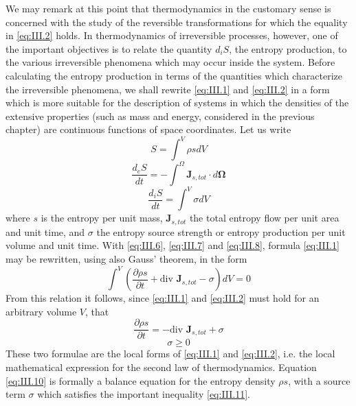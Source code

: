 We may remark at this point that thermodynamics in the customary
sense is concerned with the study of the reversible transformations for
which the equality in \eqref{eq:III.2} holds. In thermodynamics of irreversible processes, however, one of the important objectives is to relate the quantity $d_i S$, the entropy production, to the various irreversible phenomena which may occur inside the system. Before calculating the entropy production in terms of the quantities which characterize the irreversible phenomena, we shall rewrite \eqref{eq:III.1} and \eqref{eq:III.2} in a form which is more suitable for the description of systems in which the densities of the extensive properties (such as mass and energy, considered in the previous chapter) are continuous functions of space coordinates. Let us write
\begin{equation}
S = \int^V \rho s dV
    \label{eq:III.6}
\end{equation}
\begin{equation}
\frac{d_e S}{dt} = - \int^{\Omega} \bm{J}_{s,tot} \cdot d \bm{\Omega}
    \label{eq:III.7}
\end{equation}
\begin{equation}
\frac{d_i S}{dt} = \int^{V} \sigma d V
    \label{eq:III.8}
\end{equation}
where $s$ is the entropy per unit mass, $\bm{J}_{s,tot}$ the total entropy flow per unit area and unit time, and $\sigma$ the entropy source strength or entropy production per unit volume and unit time.
With \eqref{eq:III.6}, \eqref{eq:III.7} and \eqref{eq:III.8}, formula \eqref{eq:III.1} may be rewritten, using also Gauss' theorem, in the form
\begin{equation}
\int^{V} \left( \frac{\partial \rho s}{\partial t} + \textrm{div } \bm{J}_{s,tot} - \sigma \right) dV = 0
    \label{eq:III.9}
\end{equation}
From this relation it follows, since \eqref{eq:III.1} and \eqref{eq:III.2} must hold for an arbitrary volume $V$, that
\begin{equation}
\frac{\partial \rho s}{\partial t} = - \textrm{div } \bm{J}_{s,tot} + \sigma
    \label{eq:III.10}
\end{equation}
\begin{equation}
\sigma \geq 0
    \label{eq:III.11}
\end{equation}
These two formulae are the local forms of \eqref{eq:III.1} and \eqref{eq:III.2}, i.e. the local mathematical expression for the second law of thermodynamics. Equation \eqref{eq:III.10} is formally a balance equation for the entropy density $\rho s$, with a source term $\sigma$ which satisfies the important inequality \eqref{eq:III.11}.
